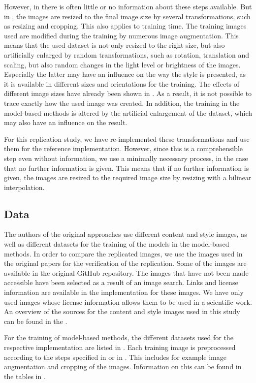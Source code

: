 However, in \paper{} there is often little or no information about these steps available. But in \implementation{}, the images are resized to the final image size by several transformations, such as resizing and cropping. This also applies to training time. The training images used are modified during the training by numerous image augmentation. This means that the used dataset is not only resized to the right size, but also artificially enlarged by random transformations, such as rotation, translation and scaling, but also random changes in the light level or brightness of the images. Especially the latter may have an influence on the way the style is presented, as it is available in different sizes and orientations for the training. The effects of different image sizes have already been shown in . As a result, it is not possible to trace exactly how the used image was created. In addition, the training in the model-based methods is altered by the artificial enlargement of the dataset, which may also have an influence on the result.

For this replication study, we have re-implemented these transformations and use them for the reference implementation. However, since this is a comprehensible step even without information, we use a minimally necessary process, in the case that no further information is given. This means that if no further information is given, the images are resized to the required image size by resizing with a bilinear interpolation.

\subsection{Data} \label{sec:data}
The authors of the original approaches use different content and style images, as well as different datasets for the training of the models in the model-based methods. In order to compare the replicated images, we use the images used in the original papers for the verification of the replication. Some of the images are available in the original GitHub repository. The images that have not been made accessible have been selected as a result of an image search. Links and license information are available in the implementation for these images. We have only used images whose license information allows them to be used in a scientific work. An overview of the sources for the content and style images used in this study can be found in the . 

For the training of model-based methods, the different datasets used for the respective implementation are listed in . Each training image is preprocessed according to the steps specified in \paper{} or in \implementation{}. This includes for example image augmentation and cropping of the images. Information on this can be found in the tables in .

